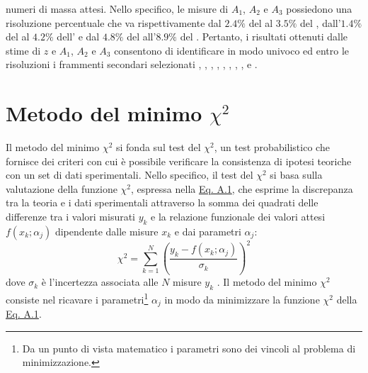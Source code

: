\documentclass[12pt,a4paper,twoside]{report}
\begin{document}
numeri di massa attesi. Nello specifico, le misure di $A_1$, $A_2$ e $A_3$ possiedono una risoluzione percentuale che va rispettivamente dal $2.4\%$ del  al $3.5\%$ del , dall'$1.4\%$ del  al $4.2\%$ dell' e dal $4.8\%$ del  all'$8.9\%$ del . Pertanto, i risultati ottenuti dalle stime di $z$ e $A_1$, $A_2$ e $A_3$ consentono di identificare in modo univoco ed entro le risoluzioni i frammenti secondari selezionati , , , , , , , ,  e .
	
	\begin{appendices}\label{cap:appendice}
		\chapter{Metodo del minimo \texorpdfstring{$\chi^2$}{chi}}
		Il metodo del minimo $\chi^2$ si fonda sul test del $\chi^2$, un test probabilistico che fornisce dei criteri con cui è possibile verificare la consistenza di ipotesi teoriche con un set di dati sperimentali. Nello specifico, il test del $\chi^2$ si basa sulla valutazione della funzione $\chi^2$, espressa nella \hyperref[eq:chi_square_method]{Eq. A.1}, che esprime la discrepanza tra la teoria e i dati sperimentali attraverso la somma dei quadrati delle differenze tra i valori misurati $y_k$ e la relazione funzionale dei valori attesi $f\left(x_k;\alpha_j\right)$ dipendente dalle misure $x_k$ e dai parametri $\alpha_j$:
		\begin{equation}
			\chi^2=\sum_{k=1}^N\left(\frac{y_k-f\left(x_k;\alpha_j\right)}{\sigma_k}\right)^2
			\label{eq:chi_square_method}
		\end{equation}
		dove $\sigma_k$ è l'incertezza associata alle $N$ misure $y_k$ \cite{Fornasini2008}. Il metodo del minimo $\chi^2$ consiste nel ricavare i parametri\footnote{Da un punto di vista matematico i parametri sono dei vincoli al problema di minimizzazione.} $\alpha_j$ in modo da minimizzare la funzione $\chi^2$ della \hyperref[eq:chi_square_method]{Eq. A.1}.
		

\end{appendices}
\end{document}
